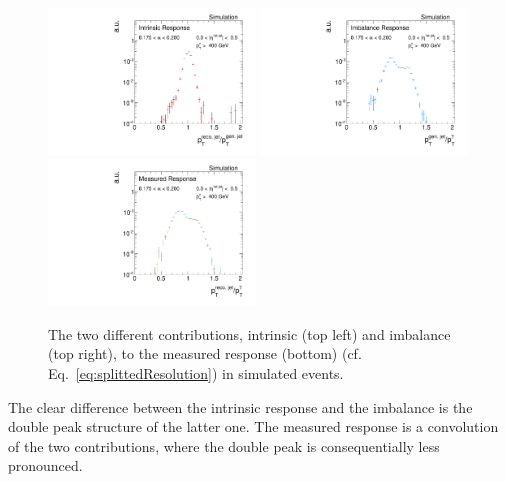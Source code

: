 \begin{figure}[b]
 \centering
     \includegraphics[width=0.49\textwidth]{figures/resolution/methodology/intrinsicResponse_6_alpha_bin.pdf}
     \includegraphics[width=0.49\textwidth]{figures/resolution/methodology/imbalanceResponse_6_alpha_bin.pdf}\\
     \includegraphics[width=0.49\textwidth]{figures/resolution/methodology/fullResponse_6_alpha_bin.pdf}
  \caption{The two different contributions, intrinsic (top left) and imbalance (top right), to the measured response (bottom) (cf. Eq.~\eqref{eq:splittedResolution}) in simulated events.}  
 \label{fig:responseExamples}
\end{figure}
The clear difference between the intrinsic response and the imbalance is the double peak structure of the latter one. The measured response is a convolution of the two
contributions, where the double peak is consequentially less pronounced.

